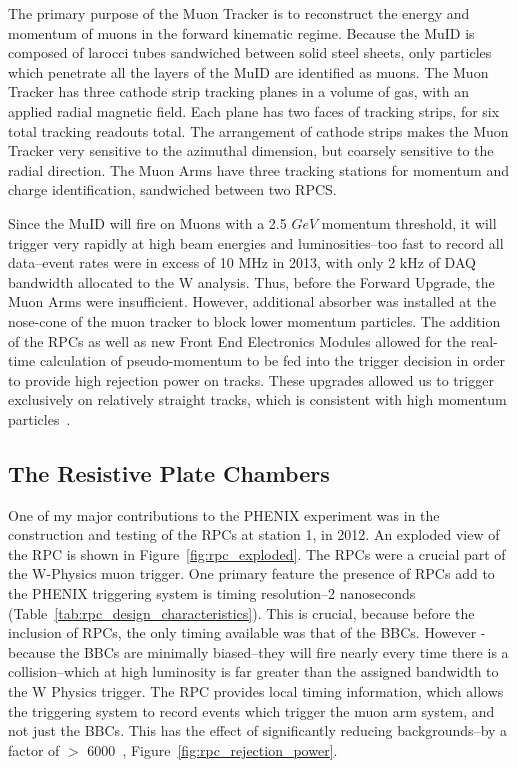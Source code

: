 The primary purpose of the Muon Tracker is to reconstruct the energy and
momentum of muons in the forward kinematic regime. Because the MuID is composed
of larocci tubes sandwiched between solid steel sheets, only particles which
penetrate all the layers of the MuID are identified as muons. The Muon Tracker
has three cathode strip tracking planes in a volume of gas, with an applied
radial magnetic field. Each plane has two faces of tracking strips, for six
total tracking readouts total. The arrangement of cathode strips  makes the Muon
Tracker very sensitive to the azimuthal dimension, but coarsely sensitive to the
radial direction. The Muon Arms have three tracking stations for momentum and
charge identification, sandwiched between two RPCS.

Since the MuID will fire on Muons with a 2.5 $GeV$ momentum threshold, it will
trigger very rapidly at high beam energies and luminosities--too fast to record
all data--event rates were in excess of 10 MHz in 2013, with only 2 kHz of DAQ
bandwidth allocated to the W analysis. Thus, before the Forward Upgrade, the
Muon Arms were insufficient. However, additional absorber was installed at the
nose-cone of the muon tracker to block lower momentum particles. The addition of
the RPCs as well as new Front End Electronics Modules allowed for the real-time
calculation of pseudo-momentum to be fed into the trigger decision in order to
provide high rejection power on tracks. These upgrades allowed us to trigger
exclusively on relatively straight tracks, which is consistent with high
momentum particles~\cite{Fukao2011}.

\clearpage
\subsection{The Resistive Plate Chambers}

One of my major contributions to the PHENIX experiment was in the construction
and testing of the RPCs at station 1, in 2012. An exploded view of the RPC is
shown in Figure~\ref{fig:rpc_exploded}. The RPCs were a crucial part of the
W-Physics muon trigger. One primary feature the presence of RPCs add to the
PHENIX triggering system is timing resolution--2 nanoseconds
(Table~\ref{tab:rpc_design_characteristics}). This is crucial, because before
the inclusion of RPCs, the only timing available was that of the BBCs. However -
because the BBCs are minimally biased--they will fire nearly every time there
is a collision--which at high luminosity is far greater than the assigned
bandwidth to the W Physics trigger. The RPC provides local timing information,
which allows the triggering system to record events which trigger the muon arm
system, and not just the BBCs. This has the effect of significantly reducing
backgrounds--by a factor of $>$ 6000~\cite{Fukao2011},
Figure~\ref{fig:rpc_rejection_power}.

